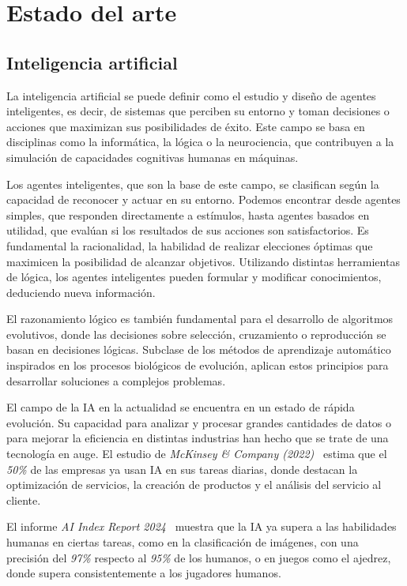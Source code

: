 \chapter{Estado del arte}
\label{ch:estado-arte}

\section{Inteligencia artificial}

La inteligencia artificial se puede definir como el estudio y diseño de agentes inteligentes, es decir, de sistemas que perciben su entorno y toman decisiones o acciones que maximizan sus posibilidades de éxito. Este campo se basa en disciplinas como la informática, la lógica o la neurociencia, que contribuyen a la simulación de capacidades cognitivas humanas en máquinas.

Los agentes inteligentes, que son la base de este campo, se clasifican según la capacidad de reconocer y actuar en su entorno. Podemos encontrar desde agentes simples, que responden directamente a estímulos, hasta agentes basados en utilidad, que evalúan si los resultados de sus acciones son satisfactorios. Es fundamental la racionalidad, la habilidad de realizar elecciones óptimas que maximicen la posibilidad de alcanzar objetivos. Utilizando distintas herramientas de lógica, los agentes inteligentes pueden formular y modificar conocimientos, deduciendo nueva información.

El razonamiento lógico es también fundamental para el desarrollo de algoritmos evolutivos, donde las decisiones sobre selección, cruzamiento o reproducción se basan en decisiones lógicas. Subclase de los métodos de aprendizaje automático inspirados en los procesos biológicos de evolución, aplican estos principios para desarrollar soluciones a complejos problemas.

El campo de la IA en la actualidad se encuentra en un estado de rápida evolución. Su capacidad para analizar y procesar grandes cantidades de datos o para mejorar la eficiencia en distintas industrias han hecho que se trate de una tecnología en auge. El estudio de \textit{McKinsey \& Company (2022)}~\cite{mckinsey2022ai} estima que el \textit{50\%} de las empresas ya usan IA en sus tareas diarias, donde destacan la optimización de servicios, la creación de productos y el análisis del servicio al cliente.

El informe \textit{AI Index Report 2024}~\cite{AIIndex2024} muestra que la IA ya supera a las habilidades humanas en ciertas tareas, como en la clasificación de imágenes, con una precisión del \textit{97\%} respecto al \textit{95\%} de los humanos, o en juegos como el ajedrez, donde supera consistentemente a los jugadores humanos.

